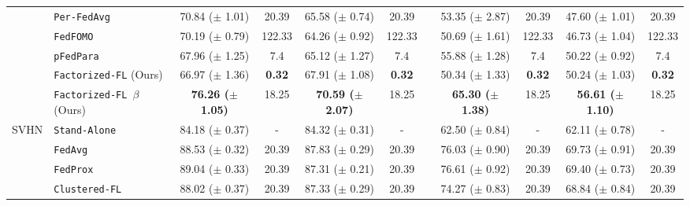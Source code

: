 \begin{table*}[t]
{\begin{tabular}{clccccccccc}
& \texttt{Per-FedAvg}~\citep{fallah2020personalized} & 
{70.84} \scriptsize($\pm$ 1.01) & 20.39 & 
{65.58} \scriptsize($\pm$ 0.74) & 20.39 & 
& 
{53.35} \scriptsize($\pm$ 2.87) & 20.39 &
{47.60} \scriptsize($\pm$ 1.01) & 20.39 \\

& \texttt{FedFOMO}~\citep{zhang2021personalized} & 
{70.19} \scriptsize($\pm$ 0.79) & 122.33 & 
{64.26} \scriptsize($\pm$ 0.92) & 122.33 & 
& 
{50.69} \scriptsize($\pm$ 1.61) & 122.33 &
{46.73} \scriptsize($\pm$ 1.04) & 122.33 \\

& \texttt{pFedPara}~\citep{anonymous2022fedpara} & 
{67.96} \scriptsize($\pm$ 1.25) &   7.4 & 
{65.12} \scriptsize($\pm$ 1.27) & 7.4  & 
& 
{55.88} \scriptsize($\pm$ 1.28) &  7.4 &
{50.22} \scriptsize($\pm$ 0.92) & 7.4 \\

\cmidrule{2-11}
& \texttt{Factorized-FL} (Ours) & 
{66.97} \scriptsize($\pm$ 1.36) &  \textbf{0.32}  & 
{67.91} \scriptsize($\pm$ 1.08) & \textbf{0.32}  & 
& 
{50.34} \scriptsize($\pm$ 1.33) & \textbf{0.32} &
{50.24} \scriptsize($\pm$ 1.03) & \textbf{0.32} \\

& \texttt{Factorized-FL $\beta$} (Ours) & 
\textbf{{76.26} \scriptsize($\pm$ 1.05)} &  18.25 & 
\textbf{{70.59} \scriptsize($\pm$ 2.07)} & 18.25 & 
& 
\textbf{{65.30} \scriptsize($\pm$ 1.38)} & 18.25 &
\textbf{{56.61} \scriptsize($\pm$ 1.10)} & 18.25 \\

\midrule
\midrule

\multirow{8}{*}{SVHN} & \texttt{Stand-Alone} &  
{84.18} \scriptsize($\pm$ 0.37) & - & 
{84.32} \scriptsize($\pm$ 0.31) & - &
& 
{62.50} \scriptsize($\pm$ 0.84) & - &
{62.11} \scriptsize($\pm$ 0.78) & - \\

& \texttt{FedAvg}~\citep{McMahan2017CommunicationEfficientLO} & 
{88.53} \scriptsize($\pm$ 0.32) & 20.39 & 
{87.83} \scriptsize($\pm$ 0.29) & 20.39 & 
& 
{76.03} \scriptsize($\pm$ 0.90) & 20.39 &
{69.73} \scriptsize($\pm$ 0.91) & 20.39 \\


& \texttt{FedProx}~\citep{li2018federated} & 
{89.04} \scriptsize($\pm$ 0.33) & 20.39 & 
{87.31} \scriptsize($\pm$ 0.21) & 20.39 & 
& 
{76.61} \scriptsize($\pm$ 0.92) & 20.39 &
{69.40} \scriptsize($\pm$ 0.73) & 20.39 \\

& \texttt{Clustered-FL}~\citep{sattler2019clustered} & 
{88.02} \scriptsize($\pm$ 0.37) & 20.39 & 
{87.33} \scriptsize($\pm$ 0.29) & 20.39 & 
& 
{74.27} \scriptsize($\pm$ 0.83) & 20.39 &
{68.84} \scriptsize($\pm$ 0.84) & 20.39 \\



\end{tabular}}
\end{table*}
